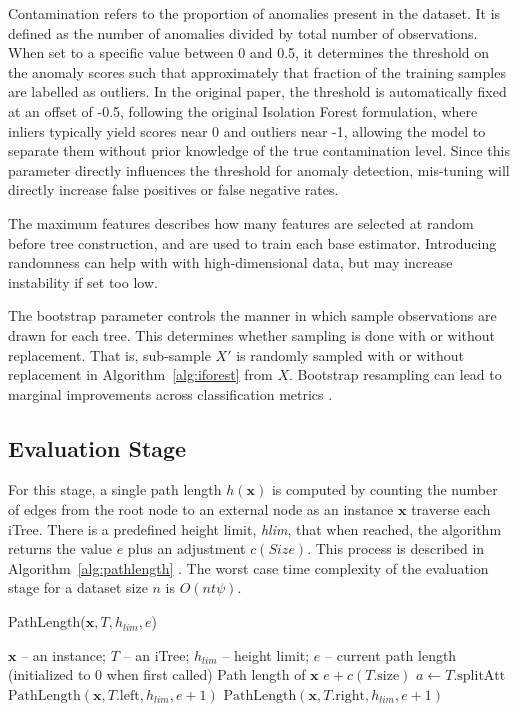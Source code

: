 \documentclass[10pt, conference]{IEEEtran}
\begin{document}
Contamination refers to the proportion of anomalies present in the dataset. It is defined as the number of anomalies divided by total number of observations. When set to a specific value between 0 and 0.5, it determines the threshold on the anomaly scores such that approximately that fraction of the training samples are labelled as outliers. In the original paper, the threshold is automatically fixed at an offset of -0.5, following the original Isolation Forest formulation, where inliers typically yield scores near 0 and outliers near -1, allowing the model to separate them without prior knowledge of the true contamination level. Since this parameter directly influences the threshold for anomaly detection, mis-tuning will directly increase false positives or false negative rates.

The maximum features describes how many features are selected at random before tree construction, and are used to train each base estimator. Introducing randomness can help with with high-dimensional data, but may increase instability if set too low.

The bootstrap parameter controls the manner in which sample observations are drawn for each tree. This determines whether sampling is done with or without replacement. That is, sub-sample $X'$ is randomly sampled with or without replacement in Algorithm~\ref{alg:iforest} from $X$. Bootstrap resampling can lead to marginal improvements across classification metrics \cite{Choi2025Impact}.

\subsection{Evaluation Stage}
For this stage, a single path length $h(\boldsymbol{x})$ is computed by counting the number of edges from the root node to an external node as an instance $\boldsymbol{x}$ traverse each iTree. There is a predefined height limit, \textit{hlim}, that when reached, the algorithm returns the value $e$ plus an adjustment $c(Size)$. This process is described in Algorithm~\ref{alg:pathlength} \cite{iforest2}. The worst case time complexity of the evaluation stage for a dataset size $n$ is $O(nt \psi)$.

\begin{algorithm}[H]
	\caption{PathLength($\boldsymbol{x}, T, h_{lim}, e$)}
	\label{alg:pathlength}
	\begin{algorithmic}[1]
		\Require $\boldsymbol{x}$ -- an instance; $T$ -- an iTree; $h_{lim}$ -- height limit; $e$ -- current path length (initialized to 0 when first called)
		\Ensure Path length of $\boldsymbol{x}$
		\State \Return $e + c(T.\text{size})$ 
		\Else
		\State $a \gets T.\text{splitAtt}$
		\State \Return $\text{PathLength}(\boldsymbol{x}, T.\text{left}, h_{lim}, e + 1)$
		\Else
		\State \Return $\text{PathLength}(\boldsymbol{x}, T.\text{right}, h_{lim}, e + 1)$
		\EndIf
		\EndIf
	\end{algorithmic}
\end{algorithm}
\end{document}
